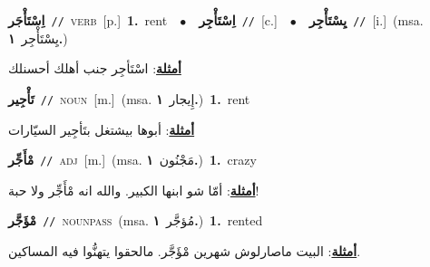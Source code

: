 \documentclass[10pt,a4paper,twoside]{article} %
\begin{document}
\begin{multicols}{2}
{\setlength\topsep{0pt}\textbf{\foreignlanguage{arabic}{اِسْتَأْجَر}}\ {\color{gray}\texttt{//}\color{black}}\ \textsc{verb}\ [p.]\ \textbf{1.}~rent\ \ $\bullet$\ \ \setlength\topsep{0pt}\textbf{\foreignlanguage{arabic}{اِسْتَأْجِر}}\ {\color{gray}\texttt{//}\color{black}}\ [c.]\ \ $\bullet$\ \ \setlength\topsep{0pt}\textbf{\foreignlanguage{arabic}{يِسْتَأْجِر}}\ {\color{gray}\texttt{//}\color{black}}\ [i.]\ \color{gray}(msa. \foreignlanguage{arabic}{يِسْتَأْجِر}~\foreignlanguage{arabic}{\textbf{١.}})\color{black}\  \begin{flushright}\color{gray}\foreignlanguage{arabic}{\textbf{\underline{\foreignlanguage{arabic}{أمثلة}}}: اسْتَأجِر جنب أهلك أحسنلك}\end{flushright}\color{black}} \vspace{2mm}

{\setlength\topsep{0pt}\textbf{\foreignlanguage{arabic}{تَأْجِير}}\ {\color{gray}\texttt{//}\color{black}}\ \textsc{noun}\ [m.]\ \color{gray}(msa. \foreignlanguage{arabic}{إِيجار}~\foreignlanguage{arabic}{\textbf{١.}})\color{black}\ \textbf{1.}~rent\  \begin{flushright}\color{gray}\foreignlanguage{arabic}{\textbf{\underline{\foreignlanguage{arabic}{أمثلة}}}: أبوها بيشتغل بتَأجِير السيّارات}\end{flushright}\color{black}} \vspace{2mm}

{\setlength\topsep{0pt}\textbf{\foreignlanguage{arabic}{مْأَجِّر}}\ {\color{gray}\texttt{//}\color{black}}\ \textsc{adj}\ [m.]\ \color{gray}(msa. \foreignlanguage{arabic}{مَجْنُون}~\foreignlanguage{arabic}{\textbf{١.}})\color{black}\ \textbf{1.}~crazy\  \begin{flushright}\color{gray}\foreignlanguage{arabic}{\textbf{\underline{\foreignlanguage{arabic}{أمثلة}}}: أمّا شو ابنها الكبير. والله انه مْأَجِّر ولا حبة!}\end{flushright}\color{black}} \vspace{2mm}

{\setlength\topsep{0pt}\textbf{\foreignlanguage{arabic}{مْؤَجَّر}}\ {\color{gray}\texttt{//}\color{black}}\ \textsc{noun\textunderscore pass}\ \color{gray}(msa. \foreignlanguage{arabic}{مُؤجَّر}~\foreignlanguage{arabic}{\textbf{١.}})\color{black}\ \textbf{1.}~rented\  \begin{flushright}\color{gray}\foreignlanguage{arabic}{\textbf{\underline{\foreignlanguage{arabic}{أمثلة}}}: البيت ماصارلوش شهرين مْؤَجَّر. مالحقوا يتهنُّوا فيه المساكين.}\end{flushright}\color{black}} \vspace{2mm}


\end{multicols}
\end{document}
